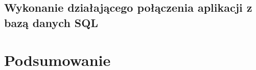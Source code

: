 \documentclass{report}
\begin{document}
\subsection{\Large Wykonanie działającego połączenia aplikacji z bazą danych SQL}

%
%

\section{\LARGE Podsumowanie}
\end{document}
